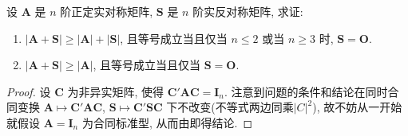 \documentclass[../../main.tex]{subfiles}
\begin{document}
\begin{proposition}\label{proposition:A+S的行列式的相关结论}
设 \(\boldsymbol{A}\) 是 \(n\) 阶正定实对称矩阵, \(\boldsymbol{S}\) 是 \(n\) 阶实反对称矩阵, 求证:
\begin{enumerate}[(1)]
\item \(|\boldsymbol{A}+\boldsymbol{S}|\geqslant |\boldsymbol{A}|+|\boldsymbol{S}|\), 且等号成立当且仅当 \(n\leqslant 2\) 或当 \(n\geqslant 3\) 时, \(\boldsymbol{S}=\boldsymbol{O}\).
\item \(|\boldsymbol{A}+\boldsymbol{S}|\geqslant |\boldsymbol{A}|\), 且等号成立当且仅当 \(\boldsymbol{S}=\boldsymbol{O}\).
\end{enumerate}
\end{proposition}
\begin{proof}
设 \(\boldsymbol{C}\) 为非异实矩阵, 使得 \(\boldsymbol{C}'\boldsymbol{A}\boldsymbol{C}=\boldsymbol{I}_n\). 注意到问题的条件和结论在同时合同变换 \(\boldsymbol{A}\mapsto\boldsymbol{C}'\boldsymbol{A}\boldsymbol{C}\), \(\boldsymbol{S}\mapsto\boldsymbol{C}'\boldsymbol{S}\boldsymbol{C}\) 下不改变(不等式两边同乘$|C|^2$), 故不妨从一开始就假设 \(\boldsymbol{A}=\boldsymbol{I}_n\) 为合同标准型, 从而由即得结论. 
\end{proof}
\end{document}
